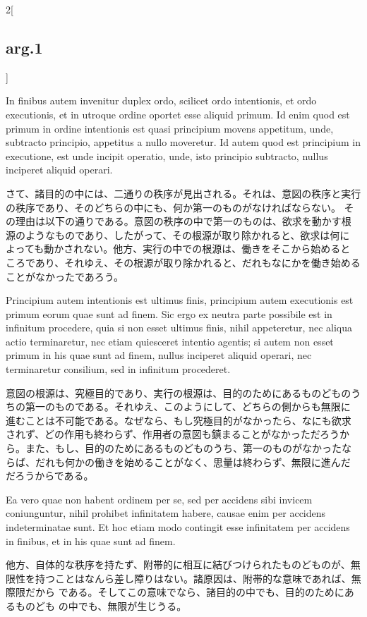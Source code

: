 \documentclass[paper=a4paper,fontsize=10pt,jafontsize=9pt,titlepage]{jlreq}
\begin{document}
\begin{paracol}{2}[\subsection{arg.1}]
\switchcolumn*

In finibus autem invenitur duplex ordo, scilicet ordo
intentionis, et ordo executionis, et in utroque ordine oportet esse
aliquid primum. Id enim quod est primum in ordine intentionis est quasi
principium movens appetitum, unde, subtracto principio, appetitus a
nullo moveretur. Id autem quod est principium in executione, est unde
incipit operatio, unde, isto principio subtracto, nullus inciperet
aliquid operari.

\switchcolumn

さて、諸目的の中には、二通りの秩序が見出される。それは、意図の秩序と実行
 の秩序であり、そのどちらの中にも、何か第一のものがなければならない。
その理由は以下の通りである。意図の秩序の中で第一のものは、欲求を動かす根
 源のようなものであり、したがって、その根源が取り除かれると、欲求は何に
 よっても動かされない。他方、実行の中での根源は、働きをそこから始めると
 ころであり、それゆえ、その根源が取り除かれると、だれもなにかを働き始める
 ことがなかったであろう。

\switchcolumn*

Principium autem intentionis est ultimus finis,
principium autem executionis est primum eorum quae sunt ad finem. Sic
ergo ex neutra parte possibile est in infinitum procedere, quia si non
esset ultimus finis, nihil appeteretur, nec aliqua actio terminaretur,
nec etiam quiesceret intentio agentis; si autem non esset primum in his
quae sunt ad finem, nullus inciperet aliquid operari, nec terminaretur
consilium, sed in infinitum procederet.

\switchcolumn

意図の根源は、究極目的であり、実行の根源は、目的のためにあるものどものう
 ちの第一のものである。それゆえ、このようにして、どちらの側からも無限に
 進むことは不可能である。なぜなら、もし究極目的がなかったら、なにも欲求
 されず、どの作用も終わらず、作用者の意図も鎮まることがなかっただろうか
 ら。また、もし、目的のためにあるものどものうち、第一のものがなかったな
 らば、だれも何かの働きを始めることがなく、思量は終わらず、無限に進んだ
 だろうからである。

\switchcolumn*

Ea vero quae non habent ordinem
per se, sed per accidens sibi invicem coniunguntur, nihil prohibet
infinitatem habere, causae enim per accidens indeterminatae sunt. Et hoc
etiam modo contingit esse infinitatem per accidens in finibus, et in his
quae sunt ad finem.

\switchcolumn

他方、自体的な秩序を持たず、附帯的に相互に結びつけられたものどものが、無
 限性を持つことはなんら差し障りはない。諸原因は、附帯的な意味であれば、無際限だから
 である。そしてこの意味でなら、諸目的の中でも、目的のためにあるものども
 の中でも、無限が生じうる。


\end{paracol}
\end{document}

